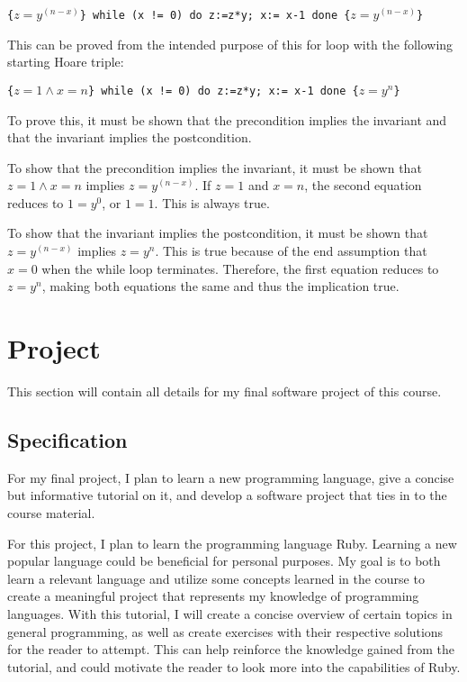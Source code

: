 \documentclass{article}
\theoremstyle{theorem}
\theoremstyle{definition}
\theoremstyle{remark}
\begin{document}
\texttt{\{$z = y^{(n - x)}$\}  while (x != 0) do z:=z*y;  x:= x-1 done  \{$z = y^{(n - x)}$\}}

This can be proved from the intended purpose of this for loop with the following starting Hoare triple:

\texttt{\{$z=1 \land x=n$\}  while (x != 0) do z:=z*y;  x:= x-1 done  \{$z = y^n$\}}

To prove this, it must be shown that the precondition implies the invariant and that the invariant implies the postcondition.

To show that the precondition implies the invariant, it must be shown that $z=1 \land x=n$ implies $z = y^{(n - x)}$. If $z=1$ and $x=n$, the second equation reduces to $1=y^0$, or $1=1$. This is always true.

To show that the invariant implies the postcondition, it must be shown that $z = y^{(n - x)}$ implies $z = y^n$. This is true because of the end assumption that $x=0$ when the while loop terminates. Therefore, the first equation reduces to $z = y^n$, making both equations the same and thus the implication true.

\newpage

\section{Project}

This section will contain all details for my final software project of this course.

\subsection{Specification}

For my final project, I plan to learn a new programming language, give a concise but informative tutorial on it, and develop a software project that ties in to the course material. 

For this project, I plan to learn the programming language Ruby. Learning a new popular language could be beneficial for personal purposes. My goal is to both learn a relevant language and utilize some concepts learned in the course to create a meaningful project that represents my knowledge of programming languages. With this tutorial, I will create a concise overview of certain topics in general programming, as well as create exercises with their respective solutions for the reader to attempt. This can help reinforce the knowledge gained from the tutorial, and could motivate the reader to look more into the capabilities of Ruby.
\end{document}

